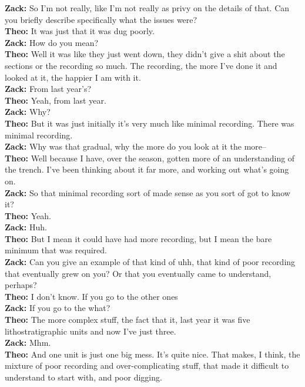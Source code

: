 \begin{arefs}
\item\label{A20}
\textbf{Zack:} So I'm not really, like I'm not really as privy on the details of that. Can you briefly describe specifically what the issues were?\\
\textbf{Theo:} It was just that it was dug poorly.\\
\textbf{Zack:} How do you mean?\\
\textbf{Theo:} Well it was like they just went down, they didn't give a shit about the sections or the recording so much. The recording, the more I've done it and looked at it, the happier I am with it.\\
\textbf{Zack:} From last year's?\\
\textbf{Theo:} Yeah, from last year.\\
\textbf{Zack:} Why?\\
\textbf{Theo:} But it was just initially it's very much like minimal recording. There was minimal recording.\\
\textbf{Zack:} Why was that gradual, why the more do you look at it the more--\\
\textbf{Theo:} Well because I have, over the season, gotten more of an understanding of the trench. I've been thinking about it far more, and working out what's going on.\\
\textbf{Zack:} So that minimal recording sort of made sense as you sort of got to know it?\\
\textbf{Theo:} Yeah.\\
\textbf{Zack:} Huh.\\
\textbf{Theo:} But I mean it could have had more recording, but I mean the bare minimum that was required.\\
\textbf{Zack:} Can you give an example of that kind of uhh, that kind of poor recording that eventually grew on you? Or that you eventually came to understand, perhaps?\\
\textbf{Theo:} I don't know. If you go to the other ones\\
\textbf{Zack:} If you go to the what?\\
\textbf{Theo:} The more complex stuff, the fact that it, last year it was five lithostratigraphic units and now I've just three.\\
\textbf{Zack:} Mhm.\\
\textbf{Theo:} And one unit is just one big mess. It's quite nice. That makes, I think, the mixture of poor recording and over-complicating stuff, that made it difficult to understand to start with, and poor digging.\\

\end{arefs}
